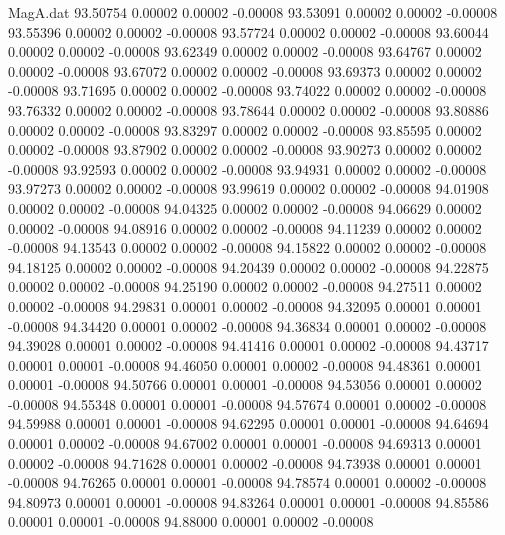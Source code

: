 \begin{filecontents}{MagA.dat}
  93.50754    0.00002    0.00002   -0.00008
  93.53091    0.00002    0.00002   -0.00008
  93.55396    0.00002    0.00002   -0.00008
  93.57724    0.00002    0.00002   -0.00008
  93.60044    0.00002    0.00002   -0.00008
  93.62349    0.00002    0.00002   -0.00008
  93.64767    0.00002    0.00002   -0.00008
  93.67072    0.00002    0.00002   -0.00008
  93.69373    0.00002    0.00002   -0.00008
  93.71695    0.00002    0.00002   -0.00008
  93.74022    0.00002    0.00002   -0.00008
  93.76332    0.00002    0.00002   -0.00008
  93.78644    0.00002    0.00002   -0.00008
  93.80886    0.00002    0.00002   -0.00008
  93.83297    0.00002    0.00002   -0.00008
  93.85595    0.00002    0.00002   -0.00008
  93.87902    0.00002    0.00002   -0.00008
  93.90273    0.00002    0.00002   -0.00008
  93.92593    0.00002    0.00002   -0.00008
  93.94931    0.00002    0.00002   -0.00008
  93.97273    0.00002    0.00002   -0.00008
  93.99619    0.00002    0.00002   -0.00008
  94.01908    0.00002    0.00002   -0.00008
  94.04325    0.00002    0.00002   -0.00008
  94.06629    0.00002    0.00002   -0.00008
  94.08916    0.00002    0.00002   -0.00008
  94.11239    0.00002    0.00002   -0.00008
  94.13543    0.00002    0.00002   -0.00008
  94.15822    0.00002    0.00002   -0.00008
  94.18125    0.00002    0.00002   -0.00008
  94.20439    0.00002    0.00002   -0.00008
  94.22875    0.00002    0.00002   -0.00008
  94.25190    0.00002    0.00002   -0.00008
  94.27511    0.00002    0.00002   -0.00008
  94.29831    0.00001    0.00002   -0.00008
  94.32095    0.00001    0.00001   -0.00008
  94.34420    0.00001    0.00002   -0.00008
  94.36834    0.00001    0.00002   -0.00008
  94.39028    0.00001    0.00002   -0.00008
  94.41416    0.00001    0.00002   -0.00008
  94.43717    0.00001    0.00001   -0.00008
  94.46050    0.00001    0.00002   -0.00008
  94.48361    0.00001    0.00001   -0.00008
  94.50766    0.00001    0.00001   -0.00008
  94.53056    0.00001    0.00002   -0.00008
  94.55348    0.00001    0.00001   -0.00008
  94.57674    0.00001    0.00002   -0.00008
  94.59988    0.00001    0.00001   -0.00008
  94.62295    0.00001    0.00001   -0.00008
  94.64694    0.00001    0.00002   -0.00008
  94.67002    0.00001    0.00001   -0.00008
  94.69313    0.00001    0.00002   -0.00008
  94.71628    0.00001    0.00002   -0.00008
  94.73938    0.00001    0.00001   -0.00008
  94.76265    0.00001    0.00001   -0.00008
  94.78574    0.00001    0.00002   -0.00008
  94.80973    0.00001    0.00001   -0.00008
  94.83264    0.00001    0.00001   -0.00008
  94.85586    0.00001    0.00001   -0.00008
  94.88000    0.00001    0.00002   -0.00008

\end{filecontents}
